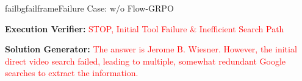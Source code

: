 \begin{small}
\begin{center}
\begin{casebox}{failbg}{failframe}{Failure Case: \model w/o Flow-GRPO}
    \vspace{1em}

    \textbf{Execution Verifier:} \textcolor{red}{STOP, Initial Tool Failure \& Inefficient Search Path}

    \vspace{1em}

    \textbf{Solution Generator:} \textcolor{red}{The answer is Jerome B. Wiesner. However, the initial direct video search failed, leading to multiple, somewhat redundant Google searches to extract the information.}
\end{casebox}

\end{center}
\end{small}
